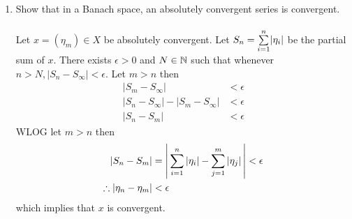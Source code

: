 \documentclass[10pt,a4paper]{report}
\begin{document}
\begin{enumerate}
	\item Show that in a Banach space, an absolutely convergent series is convergent.\\
	\\
	Let $x = (\eta_m) \in X$ be absolutely convergent.  Let $S_n = \underset{i=1}{\overset{n}{\sum}} |\eta_i|$ be the partial sum of $x$.  There exists $\epsilon > 0$ and $N \in \mathbb{N}$ such that whenever $n > N, |S_n - S_\infty| < \epsilon$.  Let $m > n$ then 
	\begin{align*}
		|S_m - S_\infty| &< \epsilon \\
		|S_n - S_\infty| - |S_m - S_\infty| &< \epsilon \\
		|S_n - S_m| &< \epsilon
	\end{align*}WLOG let $m > n$ then
	\begin{align*}
		|S_n-S_m| &= \left |\, \sum_{i=1}^n |\eta_i| - \sum_{j=1}^m |\eta_j| \,\right | < \epsilon \\
		\therefore |\eta_n - \eta_m| &< \epsilon
	\end{align*}which implies that $x$ is convergent.
	

\end{enumerate}
\end{document}
